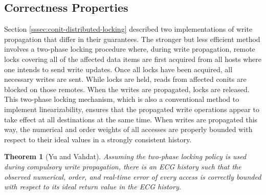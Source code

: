 \documentclass[]             %
{NASA}                       %
\newtheorem{theorem}{Theorem}[section]
\theoremstyle{definition}
\begin{document}
\subsection{Correctness Properties}
\label{ssec:conit-correctness}
Section \ref{sssec:conit-distributed-locking} described two
implementations of write propagation that differ in their
guarantees. The stronger but less efficient method involves a
two-phase locking procedure where, during write propagation, remote
locks covering all of the affected data items are first acquired from
all hosts where one intends to send write updates. Once all locks have
been acquired, all necessary writes are sent. While locks are held,
reads from affected conits are blocked on those remotes. When the
writes are propagated, locks are released. This two-phase locking
mechanism, which is also a conventional method to implement
linearizability, ensures that the propagated write operations appear
to take effect at all destinations at the same time. When writes are
propagated this way, the numerical and order weights of all accesses
are properly bounded with respect to their ideal values in a strongly
consistent history.
\begin{theorem}[Yu and Vahdat]
  \label{thm:conit-correct}
  Assuming the two-phase locking policy is used during compulsory
  write propagation, there is an ECG history such that the observed
  numerical, order, and real-time error of every access is correctly
  bounded with respect to its ideal return value in the ECG history.
\end{theorem}
\end{document}
